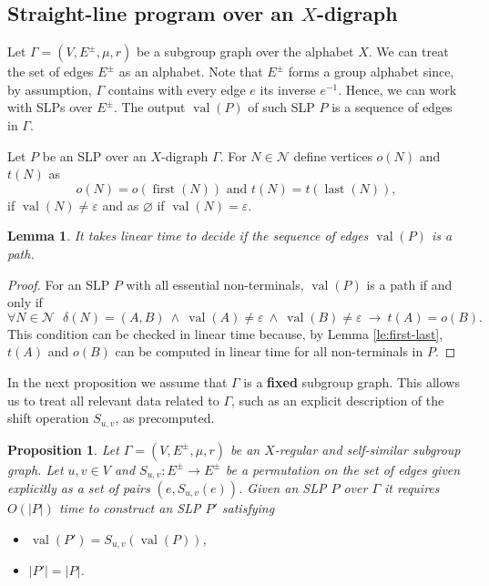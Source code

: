 \documentclass[12pt,oneside]{amsart}
\newtheorem{lemma}[theorem]{Lemma}
\newtheorem{proposition}[theorem]{Proposition}
\theoremstyle{definition}
\theoremstyle{case}
\def\CN{{\mathcal N}}
\DeclareMathOperator{\first}{{first}}
\DeclareMathOperator{\last}{{last}}
\DeclareMathOperator{\val}{val}
\begin{document}
\subsection{Straight-line program over an $X$-digraph}

Let $\Gamma=(V,E^\pm,\mu,r)$ be a subgroup graph over the alphabet $X$.
We can treat the set of edges $E^\pm$ as an alphabet.
Note that $E^\pm$ forms a group alphabet since, by assumption, 
$\Gamma$ contains with every edge $e$ its inverse $e^{-1}$.
Hence, we can work with SLPs over $E^\pm$.
The output $\val(P)$ of such SLP $P$ is a sequence of edges in $\Gamma$.

Let $P$ be an SLP over an $X$-digraph $\Gamma$.
For $N\in\CN$ define vertices $o(N)$ and $t(N)$ as
$$
o(N) = o(\first(N)) 
\mbox{ and }
t(N) = t(\last(N)), 
$$
if $\val(N)\ne\varepsilon$ and as $\varnothing$ if  
$\val(N) = \varepsilon$.

\begin{lemma}\label{le:SLP-connected}
It takes linear time to decide if the sequence of edges $\val(P)$
is a path.
\end{lemma}

\begin{proof}
For an SLP $P$ with all essential non-terminals, $\val(P)$ is a path if and only if 
$$
\forall N\in\CN
\ \ \ 
\delta(N)=(A,B)\ \wedge\ \val(A)\ne\varepsilon\ \wedge\ \val(B)\ne\varepsilon
\ \rightarrow\ 
t(A)=o(B).
$$
This condition can be checked in linear time because,
by Lemma \ref{le:first-last},
$t(A)$ and $o(B)$ can be computed in linear time for all 
non-terminals in $P$.
\end{proof}

In the next proposition we assume that $\Gamma$
is a \textbf{fixed} subgroup graph.
This allows us to treat all relevant data related to
$\Gamma$, such as an 
explicit description of the shift operation $S_{u,v}$, 
as precomputed.


\begin{proposition}\label{pr:Suv-SLP}
Let $\Gamma=(V,E^\pm,\mu,r)$ be an $X$-regular 
and self-similar subgroup graph.
Let $u,v\in V$ and $S_{u,v}:E^\pm\to E^\pm$ be a 
permutation on the set of edges given explicitly
as a set of pairs $(e,S_{u,v}(e))$.
Given an SLP $P$ over $\Gamma$ 
it requires $O(|P|)$ time to construct an SLP $P'$
satisfying
\begin{itemize}
\item 
$\val(P')=S_{u,v}(\val(P))$,
\item 
$|P'|=|P|$.
\end{itemize}
\end{proposition}
\end{document}
